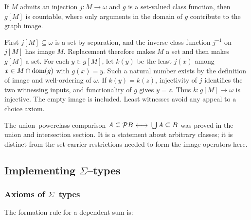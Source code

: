 \begin{theorem}
If $M$ admits an injection $j:M\to\omega$ and $g$ is a set-valued
class function, then $g[M]$ is countable, where only arguments in the
domain of $g$ contribute to the graph image.
\end{theorem}
\Proof
First $j[M]\subseteq\omega$ is a set by separation, and the inverse
class function $j^{-1}$ on $j[M]$ has image $M$. Replacement therefore
makes $M$ a set and then makes $g[M]$ a set. For each $y\in g[M]$, let $k(y)$
be the least $j(x)$ among $x\in M\cap\mathrm{dom}(g)$ with $g(x)=y$. Such a natural
number exists by the definition of image and well-ordering of $\omega$.
If $k(y)=k(z)$, injectivity of $j$ identifies the two witnessing inputs,
and functionality of $g$ gives $y=z$. Thus $k:g[M]\to\omega$ is
injective. The empty image is included. Least witnesses avoid any appeal
to a choice axiom.
\Done

The union--powerclass comparison
$A\subseteq\mathcal{P} B{\ \longleftrightarrow\ }\bigcup A\subseteq B$ was proved in the
union and intersection section. It is a statement about arbitrary classes;
it is distinct from the set-carrier restrictions needed to form the
image operators here.



\pagebreak
\subsection{Implementing \texorpdfstring{$\Sigma$}{Sigma}--types}
\subsubsection{Axioms of $\Sigma$--types}
The formation rule for a dependent sum is:
\begin{prooftree}
\end{prooftree}

